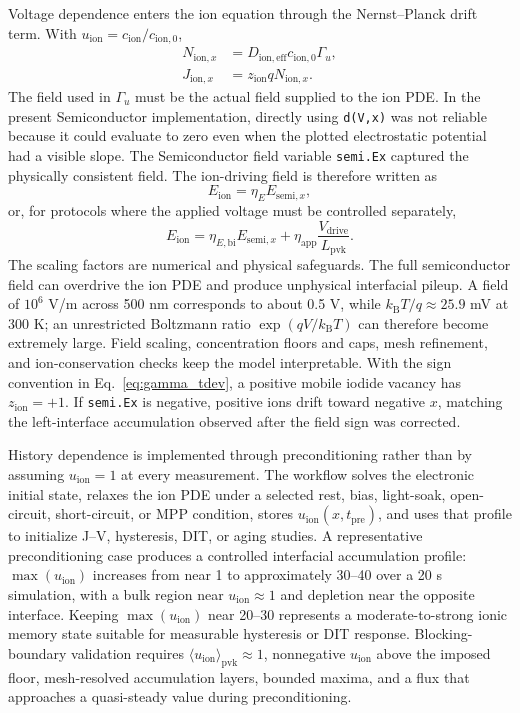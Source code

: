 Voltage dependence enters the ion equation through the Nernst--Planck drift
term. With $u_{\mathrm{ion}}=c_{\mathrm{ion}}/c_{\mathrm{ion},0}$,
\begin{align}
N_{\mathrm{ion},x} &= D_{\mathrm{ion,eff}}c_{\mathrm{ion},0}\Gamma_u,\\
J_{\mathrm{ion},x} &= z_{\mathrm{ion}}qN_{\mathrm{ion},x}.
\end{align}
The field used in $\Gamma_u$ must be the actual field supplied to the ion PDE.
In the present Semiconductor implementation, directly using
\texttt{d(V,x)} was not reliable because it could evaluate to zero even when
the plotted electrostatic potential had a visible slope. The Semiconductor
field variable \texttt{semi.Ex} captured the physically consistent field. The
ion-driving field is therefore written as
\begin{equation}
E_{\mathrm{ion}}=\eta_E E_{\mathrm{semi},x},
\end{equation}
or, for protocols where the applied voltage must be controlled separately,
\begin{equation}
E_{\mathrm{ion}}
=\eta_{E,\mathrm{bi}}E_{\mathrm{semi},x}
+\eta_{\mathrm{app}}\frac{V_{\mathrm{drive}}}{L_{\mathrm{pvk}}}.
\label{eq:eion_scaled}
\end{equation}
The scaling factors are numerical and physical safeguards. The full
semiconductor field can overdrive the ion PDE and produce unphysical
interfacial pileup. A field of $10^6$ V/m across 500 nm corresponds to about
0.5 V, while $k_{\mathrm{B}}T/q\approx25.9$ mV at 300 K; an unrestricted
Boltzmann ratio $\exp(qV/k_{\mathrm{B}}T)$ can therefore become extremely
large. Field scaling, concentration floors and caps, mesh refinement, and
ion-conservation checks keep the model interpretable. With the sign convention
in Eq.~\ref{eq:gamma_tdev}, a positive mobile iodide vacancy has
$z_{\mathrm{ion}}=+1$. If \texttt{semi.Ex} is negative, positive ions drift
toward negative $x$, matching the left-interface accumulation observed after
the field sign was corrected.

History dependence is implemented through preconditioning rather than by
assuming $u_{\mathrm{ion}}=1$ at every measurement. The workflow solves the
electronic initial state, relaxes the ion PDE under a selected rest, bias,
light-soak, open-circuit, short-circuit, or MPP condition, stores
$u_{\mathrm{ion}}(x,t_{\mathrm{pre}})$, and uses that profile to initialize
J--V, hysteresis, DIT, or aging studies. A representative preconditioning case
produces a controlled interfacial accumulation profile: $\max(u_{\mathrm{ion}})$
increases from near 1 to approximately 30--40 over a 20 s simulation, with a
bulk region near $u_{\mathrm{ion}}\approx1$ and depletion near the opposite
interface. Keeping $\max(u_{\mathrm{ion}})$ near 20--30 represents a
moderate-to-strong ionic memory state suitable for measurable hysteresis or DIT
response. Blocking-boundary validation requires
$\langle u_{\mathrm{ion}}\rangle_{\mathrm{pvk}}\approx1$, nonnegative
$u_{\mathrm{ion}}$ above the imposed floor, mesh-resolved accumulation layers,
bounded maxima, and a flux that approaches a quasi-steady value during
preconditioning.

